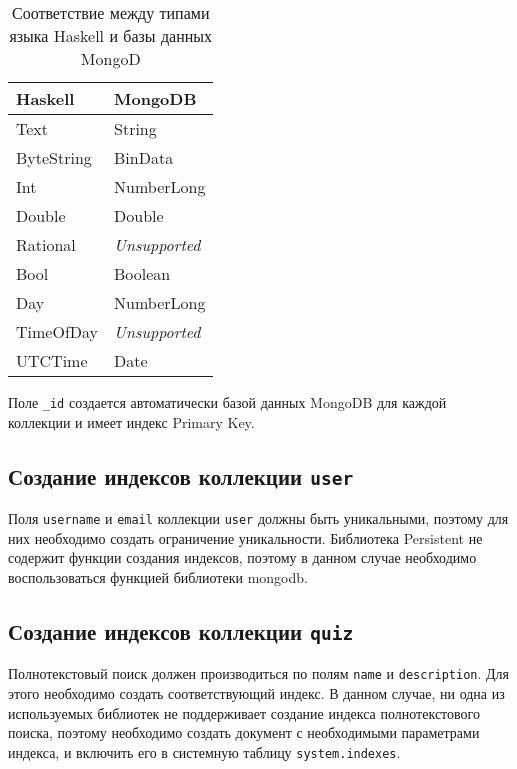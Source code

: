 \begin{table}[]
	\centering
	\caption{Соответствие между типами языка Haskell и базы данных MongoD}
	\label{tbl1}
	\begin{tabular}{|l|l|}
		\hline
		\textbf{Haskell} & \textbf{MongoDB}     \\ \hline
		Text             & String               \\ \hline
		ByteString       & BinData              \\ \hline
		Int              & NumberLong           \\ \hline
		Double           & Double               \\ \hline
		Rational         & \textit{Unsupported} \\ \hline
		Bool             & Boolean              \\ \hline
		Day              & NumberLong           \\ \hline
		TimeOfDay        & \textit{Unsupported} \\ \hline
		UTCTime          & Date                 \\ \hline
	\end{tabular}
\end{table}



Поле \texttt{\_id} создается автоматически базой данных MongoDB для каждой коллекции и имеет индекс Primary Key. 


\subsection{Создание индексов коллекции \texttt{user}}
Поля \texttt{username} и \texttt{email} коллекции \texttt{user} должны быть уникальными, поэтому для них необходимо создать ограничение уникальности. 
Библиотека Persistent не содержит функции создания индексов, поэтому в данном случае необходимо воспользоваться функцией библиотеки mongodb.



\subsection{Создание индексов коллекции \texttt{quiz}}
Полнотекстовый поиск должен производиться по полям \texttt{name} и \texttt{description}. Для этого необходимо создать соответствующий индекс.
В данном случае, ни одна из используемых библиотек не поддерживает создание индекса полнотекстового поиска, поэтому необходимо создать документ с необходимыми параметрами индекса, и включить его в системную таблицу \texttt{system.indexes}.

